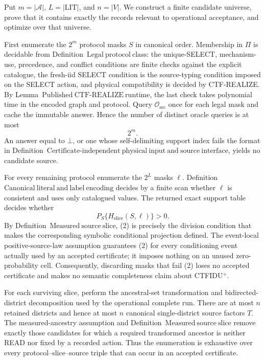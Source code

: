 Put \(m=|\mathcal A|\), \(L=|\mathrm{LIT}|\), and \(n=|V|\).  We construct a finite candidate universe, prove that it contains exactly the records relevant to operational acceptance, and optimize over that universe.

First enumerate the \(2^m\) protocol masks \(S\) in canonical order.  Membership in \(\Pi\) is decidable from Definition~\(\mathrm{Legal\ protocol\ class}\): the unique-SELECT, mechanism-use, precedence, and conflict conditions are finite checks against the explicit catalogue, the fresh-iid SELECT condition is the source-typing condition imposed on the SELECT action, and physical compatibility is decided by CTF-REALIZE.  By Lemma~\(\mathrm{Published\ CTF\text{-}REALIZE\ runtime}\), the last check takes polynomial time in the encoded graph and protocol.  Query \(\mathcal O_{\mathrm{src}}\) once for each legal mask and cache the immutable answer.  Hence the number of distinct oracle queries is at most
\[
  2^m. \tag{1}
\]
An answer equal to \(\bot\), or one whose self-delimiting support index fails the format in Definition~\(\mathrm{Certificate\text{-}independent\ physical\ input\ and\ source\ interface}\), yields no candidate source.

For every remaining protocol enumerate the \(2^L\) masks \(\ell\).  Definition~\(\mathrm{Canonical\ literal\ and\ label\ encoding}\) decides by a finite scan whether \(\ell\) is consistent and uses only catalogued values.  The returned exact support table decides whether
\[
  P_S\{H_{\mathrm{slice}}(S,\ell)\}>0. \tag{2}
\]
By Definition~\(\mathrm{Measured\ source\ slice}\), (2) is precisely the division condition that makes the corresponding symbolic conditional projection defined.  The event-local positive-source-law assumption guarantees (2) for every conditioning event actually used by an accepted certificate; it imposes nothing on an unused zero-probability cell.  Consequently, discarding masks that fail (2) loses no accepted certificate and makes no semantic completeness claim about CTFIDU\({}^{+}\).

For each surviving slice, perform the ancestral-set transformation and bidirected-district decomposition used by the operational complete run.  There are at most \(n\) retained districts and hence at most \(n\) canonical single-district source factors \(T\).  The measured-ancestry assumption and Definition~\(\mathrm{Measured\ source\ slice}\) remove exactly those candidates for which a required transformed ancestor is neither READ nor fixed by a recorded action.  Thus the enumeration is exhaustive over every protocol--slice--source triple that can occur in an accepted certificate.

